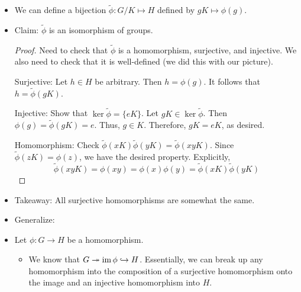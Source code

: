\documentclass[../notes.tex]{subfiles}
\begin{document}
\begin{itemize}
\begin{proof}
        Suppose $g'\in\phi^{-1}(h)$. Suppose $g'=gx$ (we do know that such an $x$ exists in $G$; in particular, choose $x=g^{-1}g'$). Then
        \begin{equation*}
            \phi(g') = \phi(gx)
            = \phi(g)\phi(x)
        \end{equation*}
        Since $\phi(g')=h=\phi(g)$, we have by the cancellation lemma that
        \begin{equation*}
            e = \phi(x)
        \end{equation*}
        i.e., $x\in K$. Therefore, $g'\in gK$, as desired.
    \end{proof}
    \item We can define a bijection $\tilde{\phi}:G/K\mapsto H$ defined by $gK\mapsto\phi(g)$.
    \item Claim: $\tilde{\phi}$ is an isomorphism of groups.
    \begin{proof}
        Need to check that $\tilde{\phi}$ is a homomorphism, surjective, and injective. We also need to check that it is well-defined (we did this with our picture).\par
        Surjective: Let $h\in H$ be arbitrary. Then $h=\phi(g)$. It follows that $h=\tilde{\phi}(gK)$.\par
        Injective: Show that $\ker\tilde{\phi}=\{eK\}$. Let $gK\in\ker\tilde{\phi}$. Then $\phi(g)=\tilde{\phi}(gK)=e$. Thus, $g\in K$. Therefore, $gK=eK$, as desired.\par
        Homomorphism: Check $\tilde{\phi}(xK)\tilde{\phi}(yK)=\tilde{\phi}(xyK)$. Since $\tilde{\phi}(zK)=\phi(z)$, we have the desired property. Explicitly,
        \begin{equation*}
            \tilde{\phi}(xyK) = \phi(xy)
            = \phi(x)\phi(y)
            = \tilde{\phi}(xK)\tilde{\phi}(yK)
        \end{equation*}
    \end{proof}
    \item Takeaway: All surjective homomorphisms are somewhat the same.
    \item Generalize:
    \item Let $\phi:G\to H$ be a homomorphism.
    \begin{itemize}
        \item We know that $G\twoheadrightarrow\operatorname{im}\phi\hookrightarrow H$. Essentially, we can break up any homomorphism into the composition of a surjective homomorphism onto the image and an injective homomorphism into $H$.
    \end{itemize}

\end{itemize}
\end{document}
